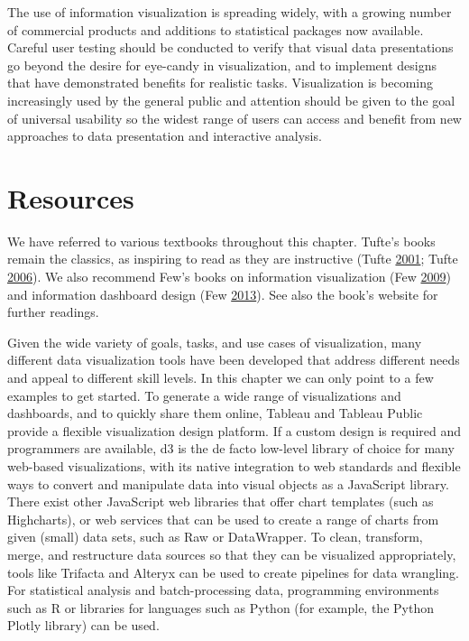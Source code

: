 \documentclass[]{krantz}
\begin{document}
The use of information visualization is spreading widely, with a growing
number of commercial products and additions to statistical packages now
available. Careful user testing should be conducted to verify that
visual data presentations go beyond the desire for eye-candy in
visualization, and to implement designs that have demonstrated benefits
for realistic tasks. Visualization is becoming increasingly used by the
general public and attention should be given to the goal of universal
usability so the widest range of users can access and benefit from new
approaches to data presentation and interactive analysis.

\hypertarget{sec:viz-6}{\section{Resources}\label{sec:viz-6}}

We have referred to various textbooks throughout this chapter. Tufte's
books remain the classics, as inspiring to read as they are instructive
(Tufte \protect\hyperlink{ref-edward2001visual}{2001}; Tufte
\protect\hyperlink{ref-edward2006beauty}{2006}). We also recommend Few's
books on information visualization (Few
\protect\hyperlink{ref-few2009now}{2009}) and information dashboard
design (Few \protect\hyperlink{ref-few2013information}{2013}). See also
the book's website for further readings.

Given the wide variety of goals, tasks, and use cases of visualization,
many different data visualization tools have been developed that address
different needs and appeal to different skill levels. In this chapter we
can only point to a few examples to get started. To generate a wide
range of visualizations and dashboards, and to quickly share them
online, Tableau and Tableau Public provide a flexible visualization
design platform. If a custom design is required and programmers are
available, d3 is the de facto low-level library of choice for many
web-based visualizations, with its native integration to web standards
and flexible ways to convert and manipulate data into visual objects as
a JavaScript library. There exist other JavaScript web libraries that
offer chart templates (such as Highcharts), or web services that can be
used to create a range of charts from given (small) data sets, such as
Raw or DataWrapper. To clean, transform, merge, and restructure data
sources so that they can be visualized appropriately, tools like
Trifacta and Alteryx can be used to create pipelines for data wrangling.
For statistical analysis and batch-processing data, programming
environments such as R or libraries for languages such as Python (for
example, the Python Plotly library) can be used.
\end{document}
